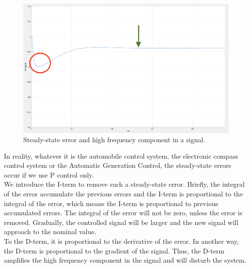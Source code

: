 \begin{figure}[t]
\center
\includegraphics[scale=0.3]{figure/3_2_steady.png}
\caption{Steady-state error and high frequency component in a signal.}
\label{3_2_steady}
\end{figure}

In reality, whatever it is the automobile control system, the electronic compass control system or the Automatic Generation Control, the steady-state errors occur if we use P control only. \\

We introduce the I-term to remove such a steady-state error. Briefly, the integral of the error accumulate the previous errors and the I-term is proportional to the integral of the error, which means the I-term is proportional to previous accumulated errors. The integral of the error will not be zero, unless the error is removed. Gradually, the controlled signal will be larger and the new signal will approach to the nominal value. \\

To the D-term, it is proportional to the derivative of the error. In another way, the D-term is proportional to the gradient of the signal. Thus, the D-term amplifies the high frequency component in the signal and will disturb the system. \\